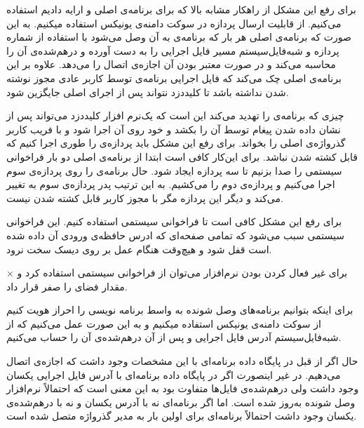 برای رفع این مشکل از راهکار مشابه بالا که برای برنامه‌ی اصلی و  ارایه دادیم استفاده می‌کنیم. از قابلیت ارسال  پردازه در سوکت دامنه‌ی یونیکس استفاده میکنیم. به این صورت که برنامه‌ی اصلی هر بار که برنامه‌ی  به آن وصل می‌شود با استفاده از شماره پردازه و شبه‌فایل‌سیستم  مسیر فایل اجرایی  را به دست آورده و درهم‌شده‌ی آن را محاسبه می‌کند و در صورت معتبر بودن آن اجازه‌ی اتصال را می‌دهد. علاوه بر این برنامه‌ی اصلی چک می‌کند که فایل اجرایی برنامه‌ی  توسط کاربر عادی مجوز نوشته شدن نداشته باشد تا کلیددزد نتواند پس از اجرای  اصلی جایگزین شود.

چیزی که برنامه‌ی  را تهدید می‌کند این است که یک‌نرم افزار کلیددزد می‌تواند پس از نشان داده شدن پیغام توسط  آن را بکشد و خود روی آن  اجرا شود و با فریب کاربر گذرواژه‌ی اصلی را بخواند. برای رفع این مشکل باید پردازه‌ی  را طوری اجرا کنیم که قابل کشته شدن نباشد. برای این‌کار کافی است ابتدا از برنامه‌ی اصلی دو بار فراخوانی سیستمی  را صدا بزنیم تا سه پردازه ایجاد شود. حال برنامه‌ی  را روی پردازه‌ی سوم اجرا می‌کنیم و پردازه‌ی دوم را می‌کشیم. به این ترتیب پدر پردازه‌ی سوم به  تغییر می‌کند و دیگر این پردازه مگر با مجوز کاربر  قابل کشته شدن نیست.



برای رفع این مشکل کافی است تا فراخوانی سیستمی  استفاده کنیم. این فراخوانی سیستمی سبب می‌شود که تمامی صفحه‌ای که ادرس حافظه‌ی ورودی آن داده شده است قفل شود و هیچ‌وقت هنگام عمل  بر روی دیسک سخت نرود.

×
برای غیر فعال کردن  بودن نرم‌افزار می‌توان از فراخوانی سیستمی  استفاده کرد و مقدار فضای  را صفر قرار داد.



برای اینکه بتوانیم برنامه‌های وصل شونده به واسط برنامه نویسی را احراز هویت کنیم از سوکت دامنه‌ی یونیکس استفاده میکنیم و به این صورت عمل می‌کنیم که از شبه‌فایل‌سیستم  آدرس فایل اجرایی و پس از آن درهم‌شده‌ی آن را حساب می‌کنیم. 

حال اگر از قبل در پایگاه داده برنامه‌ای با این مشخصات وجود داشت که اجازه‌ی اتصال می‌دهیم. در غیر اینصورت اگر در پایگاه داده برنامه‌ای با آدرس فایل اجرایی یکسان وجود داشت ولی درهم‌شده‌ی فایل‌ها متفاوت بود به این معنی است که احتمالاً نرم‌افزار وصل شونده به‌روز شده است. اما اگر برنامه‌ای نه با آدرس یکسان و نه با درهم‌شده‌ی یکسان وجود داشت احتمالاً برنامه‌ای برای اولین بار به مدیر گذرواژه متصل شده است.

